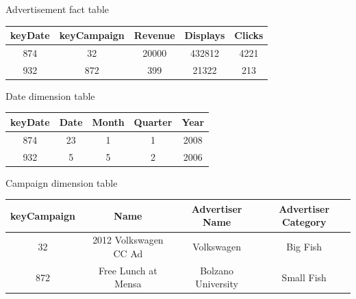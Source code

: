 Advertisement fact table\\
\begin{tabular}{|c|c|c|c|c|}
\hline
keyDate & keyCampaign & Revenue & Displays & Clicks\\
\hline
874 & 32 & 20000 & 432812 & 4221\\
932 & 872 & 399 & 21322 & 213\\
\hline
\end{tabular}

Date dimension table\\
\begin{tabular}{|c|c|c|c|c|}
\hline
keyDate & Date & Month & Quarter & Year\\
\hline
874 & 23 & 1 & 1 & 2008\\
932 & 5 & 5 & 2 & 2006\\
\hline
\end{tabular}

Campaign dimension table\\
\begin{tabular}{|c|c|c|c|}
\hline
keyCampaign & Name & Advertiser Name & Advertiser Category\\
\hline
32 & 2012 Volkswagen CC Ad & Volkswagen & Big Fish\\
872 & Free Lunch at Mensa & Bolzano University & Small Fish\\
\hline
\end{tabular}

\clearpage
